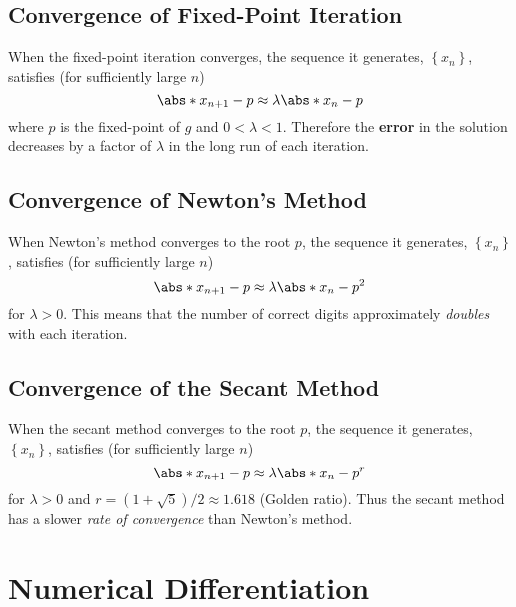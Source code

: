 \documentclass{article}
\begin{document}
\subsection{Convergence of Fixed-Point Iteration}
When the fixed-point iteration converges, the sequence it generates,
\(\left\{ x_n \right\}\), satisfies (for sufficiently large \(n\))
\begin{equation*}
    \abs*{x_{n + 1} - p} \approx \lambda \abs*{x_n - p}
\end{equation*}
where \(p\) is the fixed-point of \(g\) and \(0 < \lambda < 1\).
Therefore the \textbf{error} in the solution decreases by a factor of
\(\lambda\) in the long run of each iteration.
\subsection{Convergence of Newton's Method}
When Newton's method converges to the root \(p\), the sequence it
generates, \(\left\{ x_n \right\}\), satisfies (for sufficiently large
\(n\))
\begin{equation*}
    \abs*{x_{n + 1} - p} \approx \lambda \abs*{x_n - p}^2
\end{equation*}
for \(\lambda > 0\). This means that the number of correct digits
approximately \textit{doubles} with each iteration.
\subsection{Convergence of the Secant Method}
When the secant method converges to the root \(p\), the sequence it
generates, \(\left\{ x_n \right\}\), satisfies (for sufficiently large
\(n\))
\begin{equation*}
    \abs*{x_{n + 1} - p} \approx \lambda \abs*{x_n - p}^r
\end{equation*}
for \(\lambda > 0\) and
\(r = \left( 1 + \sqrt{5} \right)/2 \approx 1.618\) (Golden ratio). Thus
the secant method has a slower \textit{rate of convergence} than
Newton's method.
\section{Numerical Differentiation}
\end{document}
